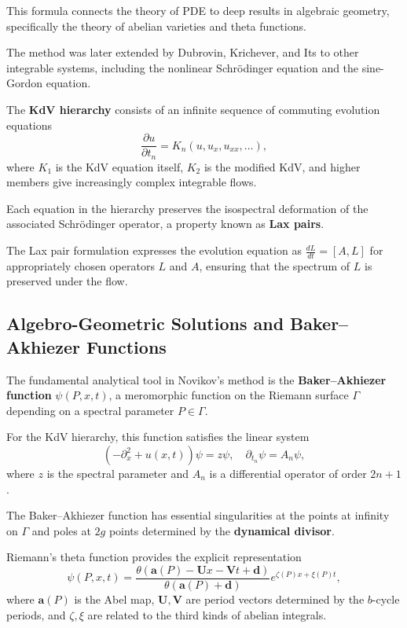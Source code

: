 This formula connects the theory of PDE to deep results in algebraic geometry, specifically the theory of abelian varieties and theta functions.

The method was later extended by Dubrovin, Krichever, and Its to other integrable systems, including the nonlinear Schrödinger equation and the sine-Gordon equation.

The \textbf{KdV hierarchy} consists of an infinite sequence of commuting evolution equations
\[
\frac{\partial u}{\partial t_n} = K_n(u, u_x, u_{xx}, \ldots),
\]
where $K_1$ is the KdV equation itself, $K_2$ is the modified KdV, and higher members give increasingly complex integrable flows.

Each equation in the hierarchy preserves the isospectral deformation of the associated Schrödinger operator, a property known as \textbf{Lax pairs}.

The Lax pair formulation expresses the evolution equation as $\frac{dL}{dt} = [A, L]$ for appropriately chosen operators $L$ and $A$, ensuring that the spectrum of $L$ is preserved under the flow.

\subsection*{Algebro-Geometric Solutions and Baker--Akhiezer Functions}

The fundamental analytical tool in Novikov's method is the \textbf{Baker--Akhiezer function} $\psi(P, x, t)$, a meromorphic function on the Riemann surface $\Gamma$ depending on a spectral parameter $P \in \Gamma$.

For the KdV hierarchy, this function satisfies the linear system
\[
(-\partial_x^2 + u(x,t))\psi = z\psi, \quad \partial_{t_n}\psi = A_n \psi,
\]
where $z$ is the spectral parameter and $A_n$ is a differential operator of order $2n+1$.

The Baker--Akhiezer function has essential singularities at the points at infinity on $\Gamma$ and poles at $2g$ points determined by the \textbf{dynamical divisor}.

Riemann's theta function provides the explicit representation
\[
\psi(P, x, t) = \frac{\theta(\mathbf{a}(P) - \mathbf{U}x - \mathbf{V}t + \mathbf{d})}{\theta(\mathbf{a}(P) + \mathbf{d})} e^{\zeta(P)x + \xi(P)t},
\]
where $\mathbf{a}(P)$ is the Abel map, $\mathbf{U}, \mathbf{V}$ are period vectors determined by the $b$-cycle periods, and $\zeta, \xi$ are related to the third kinds of abelian integrals.

